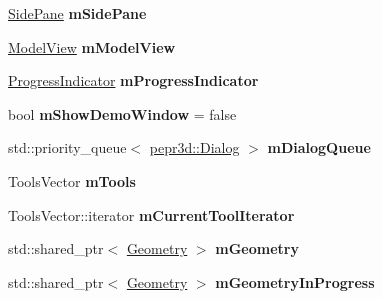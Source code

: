 \begin{DoxyCompactItemize}
\mbox{\hyperlink{classpepr3d_1_1_side_pane}{Side\+Pane}} {\bfseries m\+Side\+Pane}
\item 
\mbox{\label{classpepr3d_1_1_main_application_ad6ade9e5898bd8e926e59c36af3aadf0}} 
\mbox{\hyperlink{classpepr3d_1_1_model_view}{Model\+View}} {\bfseries m\+Model\+View}
\item 
\mbox{\label{classpepr3d_1_1_main_application_a584e07294abcf01b259bfa7b0e326965}} 
\mbox{\hyperlink{classpepr3d_1_1_progress_indicator}{Progress\+Indicator}} {\bfseries m\+Progress\+Indicator}
\item 
\mbox{\label{classpepr3d_1_1_main_application_a8197cbb3456a81fbdb0d4cf501e85518}} 
bool {\bfseries m\+Show\+Demo\+Window} = false
\item 
\mbox{\label{classpepr3d_1_1_main_application_a5fc071f761e157f98066cf1ca9f3b2de}} 
std\+::priority\+\_\+queue$<$ \mbox{\hyperlink{classpepr3d_1_1_dialog}{pepr3d\+::\+Dialog}} $>$ {\bfseries m\+Dialog\+Queue}
\item 
\mbox{\label{classpepr3d_1_1_main_application_a350c54b92a68ddf70b7332eeecdee4b7}} 
Tools\+Vector {\bfseries m\+Tools}
\item 
\mbox{\label{classpepr3d_1_1_main_application_abd3f6abd8bd685f463606ddc6ce07c59}} 
Tools\+Vector\+::iterator {\bfseries m\+Current\+Tool\+Iterator}
\item 
\mbox{\label{classpepr3d_1_1_main_application_ad9b98e4e97ef223e56901a7adf438006}} 
std\+::shared\+\_\+ptr$<$ \mbox{\hyperlink{classpepr3d_1_1_geometry}{Geometry}} $>$ {\bfseries m\+Geometry}
\item 
\mbox{\label{classpepr3d_1_1_main_application_a5be480a3d12e8f757179949d7b9c4c3c}} 
std\+::shared\+\_\+ptr$<$ \mbox{\hyperlink{classpepr3d_1_1_geometry}{Geometry}} $>$ {\bfseries m\+Geometry\+In\+Progress}
\item 
\mbox{\label{classpepr3d_1_1_main_application_ad64561adc639db4aa6b8435a42b0d18e}} 

\end{DoxyCompactItemize}
